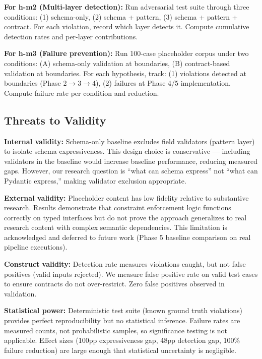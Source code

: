 \textbf{For h-m2 (Multi-layer detection):} Run adversarial test suite through three conditions: (1) schema-only, (2) schema + pattern, (3) schema + pattern + contract. For each violation, record which layer detects it. Compute cumulative detection rates and per-layer contributions.

\textbf{For h-m3 (Failure prevention):} Run 100-case placeholder corpus under two conditions: (A) schema-only validation at boundaries, (B) contract-based validation at boundaries. For each hypothesis, track: (1) violations detected at boundaries (Phase 2$\rightarrow$3$\rightarrow$4), (2) failures at Phase 4/5 implementation. Compute failure rate per condition and reduction.

\subsection{Threats to Validity}

\textbf{Internal validity:} Schema-only baseline excludes field validators (pattern layer) to isolate schema expressiveness. This design choice is conservative --- including validators in the baseline would increase baseline performance, reducing measured gaps. However, our research question is ``what can schema express'' not ``what can Pydantic express,'' making validator exclusion appropriate.

\textbf{External validity:} Placeholder content has low fidelity relative to substantive research. Results demonstrate that constraint enforcement logic functions correctly on typed interfaces but do not prove the approach generalizes to real research content with complex semantic dependencies. This limitation is acknowledged and deferred to future work (Phase 5 baseline comparison on real pipeline executions).

\textbf{Construct validity:} Detection rate measures violations caught, but not false positives (valid inputs rejected). We measure false positive rate on valid test cases to ensure contracts do not over-restrict. Zero false positives observed in validation.

\textbf{Statistical power:} Deterministic test suite (known ground truth violations) provides perfect reproducibility but no statistical inference. Failure rates are measured counts, not probabilistic samples, so significance testing is not applicable. Effect sizes (100pp expressiveness gap, 48pp detection gap, 100\% failure reduction) are large enough that statistical uncertainty is negligible.
